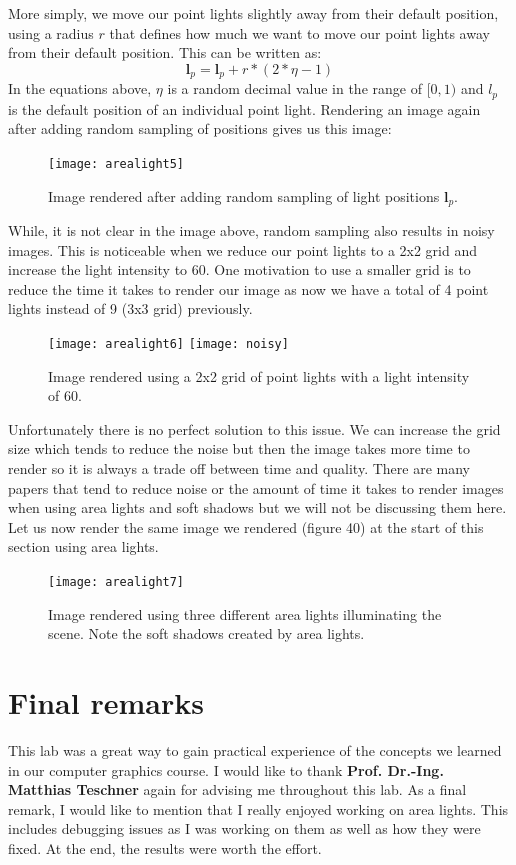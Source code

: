\documentclass[11pt,a4paper]{article}
\begin{document}
	\noindent
	More simply, we move our point lights slightly away from their default position, using a radius $r$ that defines how much we want to move our point lights away from their default position. This can be written as:
	\begin{equation}
		\boldsymbol{l}_{p} = \boldsymbol{l}_{p} + r * (2 * \eta - 1)
	\end{equation}
	\noindent
	In the equations above, $\eta$ is a random decimal value in the range of $[0, 1)$ and $l_{p}$ is the default position of an individual point light. Rendering an image again after adding random sampling of positions gives us this image:
	\begin{figure}[H]
		\centering
		\captionsetup{justification=centering}
		\texttt{[image: arealight5]}\quad
		\caption{Image rendered after adding random sampling of light positions $\boldsymbol{l}_{p}$.}
	\end{figure}
	\noindent
	While, it is not clear in the image above, random sampling also results in noisy images. This is noticeable when we reduce our point lights to a 2x2 grid and increase the light intensity to $60$. One motivation to use a smaller grid is to reduce the time it takes to render our image as now we have a total of 4 point lights instead of 9 (3x3 grid) previously.
	\begin{figure}[H]
		\centering
		\captionsetup{justification=centering}
		\texttt{[image: arealight6]}\quad
		\texttt{[image: noisy]}\quad
		\caption{Image rendered using a 2x2 grid of point lights with a light intensity of $60$.}
	\end{figure}
	\noindent
	Unfortunately there is no perfect solution to this issue. We can increase the grid size which tends to reduce the noise but then the image takes more time to render so it is always a trade off between time and quality. There are many papers that tend to reduce noise or the amount of time it takes to render images when using area lights and soft shadows but we will not be discussing them here. Let us now render the same image we rendered (figure 40) at the start of this section using area lights.
	
	\begin{figure}[H]
		\centering
		\captionsetup{justification=centering}
		\texttt{[image: arealight7]}\quad
		\caption{Image rendered using three different area lights illuminating the scene. Note the soft shadows created by area lights.}
	\end{figure}
	
	\section{Final remarks}
	This lab was a great way to gain practical experience of the concepts we learned in our computer graphics course. I would like to thank \textbf{Prof. Dr.-Ing. Matthias Teschner} again for advising me throughout this lab. As a final remark, I would like to mention that I really enjoyed working on area lights. This includes debugging issues as I was working on them as well as how they were fixed. At the end, the results were worth the effort.
	
	
	
	
\end{document}
